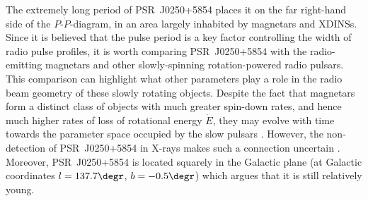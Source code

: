 The extremely long period of PSR~J0250+5854 places it on the far right-hand side of the $P$-$\dot{P}$-diagram, in an area largely inhabited by magnetars and XDINSs. Since it is believed that the pulse period is a key factor controlling the width of radio pulse profiles, it is worth comparing PSR~J0250+5854 with the radio-emitting magnetars and other slowly-spinning rotation-powered radio pulsars. This comparison can highlight what other parameters play a role in the radio beam geometry of these slowly rotating objects.  Despite the fact that magnetars form a distinct class of objects with much greater spin-down rates, and hence much higher rates of loss of rotational energy $\dot{E}$, they may evolve with time towards the parameter space occupied by the slow pulsars \citep[e.g.][]{VRP+2013}. However, the non-detection of PSR~J0250+5854 in X-rays makes such a connection uncertain \citep{TBC+2018}. Moreover, PSR~J0250+5854 is located squarely in the Galactic plane (at Galactic coordinates $l=137.7\degr$, $b=-0.5\degr$) which argues that it is still relatively young.

